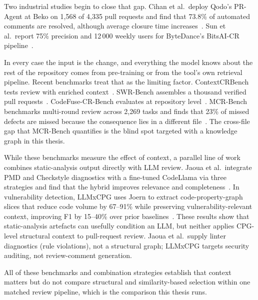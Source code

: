 Two industrial studies begin to close that gap. Cihan et al.\ deploy Qodo's
PR-Agent at Beko on 1,568 of 4,335 pull requests and find that 73.8\% of
automated comments are resolved, although average closure time
increases~\cite{cihan2025automated}. Sun et al.\ report 75\% precision and
12\,000 weekly users for ByteDance's BitsAI-CR
pipeline~\cite{sun2025bitsaicr}.

In every case the input is the change, and everything the model knows about
the rest of the repository comes from pre-training or from the tool's own
retrieval pipeline. Recent benchmarks treat that as the limiting factor.
ContextCRBench tests review with enriched
context~\cite{hu2025contextcrbench}. SWR-Bench assembles a thousand verified
pull requests~\cite{zeng2025swrbench}. CodeFuse-CR-Bench evaluates at
repository level~\cite{guo2025codefusecrbench}. MCR-Bench benchmarks
multi-round review across 2,269 tasks and finds that 23\% of missed defects
are missed because the consequence lies in a different
file~\cite{zheng2026mcrbench}. The cross-file gap that MCR-Bench quantifies
is the blind spot targeted with a knowledge graph in this thesis.

While these benchmarks measure the effect of context, a parallel line of work
combines static-analysis output directly with LLM review. Jaoua et al.\
integrate PMD and Checkstyle diagnostics with a fine-tuned CodeLlama via
three strategies and find that the hybrid improves relevance and
completeness~\cite{jaoua2025combining}. In vulnerability detection, LLMxCPG
uses Joern to extract code-property-graph slices that reduce code volume by
67--91\% while preserving vulnerability-relevant context, improving F1 by
15--40\% over prior baselines~\cite{lekssays2025llmxcpg}. These results show that
static-analysis artefacts can usefully condition an LLM, but neither applies
CPG-level structural context to pull-request review. Jaoua et al.\ supply
linter diagnostics (rule violations), not a structural graph; LLMxCPG targets
security auditing, not review-comment generation.

All of these benchmarks and combination strategies establish that context
matters but do not compare structural and similarity-based selection within
one matched review pipeline, which is the comparison this thesis runs.
